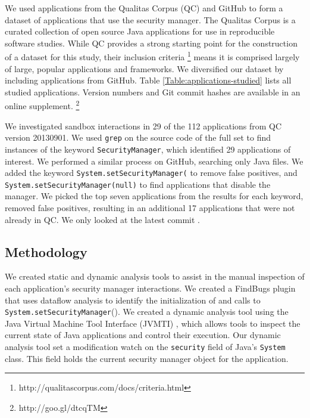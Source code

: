\documentclass{sig-alternate}
\begin{document}
We used applications from the Qualitas Corpus (QC)
\cite{QualitasCorpus:APSEC:2010} and GitHub to form a dataset of applications
that use the security manager.  The Qualitas Corpus is a curated collection of
open source Java applications for use in reproducible software studies.  While
QC provides a strong starting point for the construction of a dataset for this
study, their inclusion criteria%
\footnote{http://qualitascorpus.com/docs/criteria.html%
} means it is comprised largely of large, popular applications and frameworks.
We diversified our dataset by including applications from GitHub. Table
\ref{Table:applications-studied} lists all studied applications. Version numbers
and Git commit hashes are available in an online supplement.%
\footnote{http://goo.gl/dtcqTM%
} 

We investigated sandbox interactions in 29 of the 112 applications from QC
version 20130901.  We used \texttt{grep} on the source code of the full set
to find instances of the keyword \texttt{SecurityManager}, which
identified 29 applications of interest.  We performed a similar process on
GitHub, searching only Java files. We added the keyword
\texttt{System.setSecurityManager(} to remove false positives, and
\texttt{System.setSecurityManager(null)} to find applications that disable the
manager. We picked the top seven applications from the results for each keyword,
removed false positives, resulting in an additional 17 applications that
were not already in QC. We only looked at the latest commit .

\subsection{Methodology}

We created static and dynamic analysis tools
to assist in the manual inspection of each application's security manager
interactions. We created a 
FindBugs \cite{hovemeyer_finding_2004} plugin
that uses dataflow analysis to identify the initialization of and calls to \texttt{System.setSecurityManager}().
We created a dynamic analysis tool using the Java Virtual Machine
Tool Interface (JVMTI) \cite{_jvmti}, which allows
tools to inspect the current state of Java applications and control
their execution. Our dynamic analysis tool set a modification watch
on the \texttt{security} field of Java's \texttt{System} class. This
field holds the current security manager object for the application.
\end{document}
